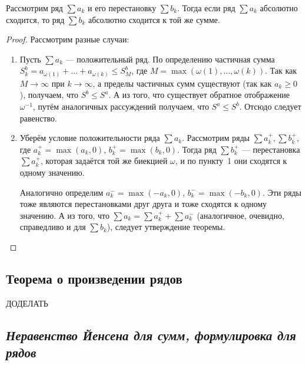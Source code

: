 \begin{theorem}
	Рассмотрим ряд \(\sum a_k\) и его перестановку \(\sum b_k\). Тогда если ряд \(\sum a_k\) абсолютно сходится, то ряд \(\sum b_k\) абсолютно сходится к той же сумме.
\end{theorem}
\begin{proof}
	Рассмотрим разные случаи:
	\begin{enumerate}
		\item Пусть \(\sum a_k\) --- положительный ряд. По определению частичная сумма \(S_k^b = a_{\omega(1)} + \ldots + a_{\omega(k)} \leqslant S_M^b\), где \(M = \max (\omega(1), \ldots, \omega(k))\). Так как \(M \to \infty\) при \(k \to \infty\), а пределы частичных сумм существуют (так как \(a_k \geqslant 0\)), получаем, что \(S^b \leqslant S^a\). А из того, что существует обратное отображение \(\omega^{-1}\), путём аналогичных рассуждений получаем, что \(S^a \leqslant S^b\). Отсюдо следует равенство.
		\item Уберём условие положительности ряда \(\sum a_k\). Рассмотрим ряды \linebreak \(\sum a_k^+, \sum b_k^+\), где \(a_k^+ = \max (a_k, 0)\), \(b_k^+ = \max (b_k, 0)\). Тогда ряд \(\sum b_k^+\) --- перестановка \(\sum a_k^+\), которая задаётся той же биекцией \(\omega\), и по пункту~1 они сходятся к одному значению. 
		
		Аналогично определим \(a_k^- = \max (-a_k, 0)\), \(b_k^- = \max (-b_k, 0)\). Эти ряды тоже являются перестановками друг друга и тоже сходятся к одному значению. А из того, что \(\sum a_k = \sum a_k^+ +\sum a_k^-\) (аналогичное, очевидно, справедливо и для \(\sum b_k\)), следует утверждение теоремы.
	\end{enumerate}
\end{proof}

\subsection{Теорема о произведении рядов}

ДОДЕЛАТЬ

\subsection{\itshape Неравенство Йенсена для сумм, формулировка для рядов}

